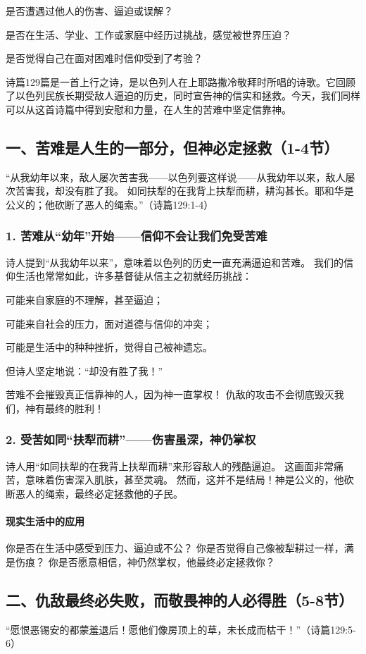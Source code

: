 \documentclass[a4paper, 12pt]{article}
\begin{document}
是否遭遇过他人的伤害、逼迫或误解？

是否在生活、学业、工作或家庭中经历过挑战，感觉被世界压迫？

是否觉得自己在面对困难时信仰受到了考验？

诗篇129篇是一首上行之诗，是以色列人在上耶路撒冷敬拜时所唱的诗歌。它回顾了以色列民族长期受敌人逼迫的历史，同时宣告神的信实和拯救。今天，我们同样可以从这首诗篇中得到安慰和力量，在人生的苦难中坚定信靠神。

\subsection*{一、苦难是人生的一部分，但神必定拯救（1-4节）}
“从我幼年以来，敌人屡次苦害我——以色列要这样说——从我幼年以来，敌人屡次苦害我，却没有胜了我。
如同扶犁的在我背上扶犁而耕，耕沟甚长。耶和华是公义的；他砍断了恶人的绳索。”（诗篇129:1-4）

\subsubsection*{1. 苦难从“幼年”开始——信仰不会让我们免受苦难}
诗人提到“从我幼年以来”，意味着以色列的历史一直充满逼迫和苦难。
我们的信仰生活也常常如此，许多基督徒从信主之初就经历挑战：

可能来自家庭的不理解，甚至逼迫；

可能来自社会的压力，面对道德与信仰的冲突；

可能是生活中的种种挫折，觉得自己被神遗忘。

但诗人坚定地说：“却没有胜了我！”

苦难不会摧毁真正信靠神的人，因为神一直掌权！
仇敌的攻击不会彻底毁灭我们，神有最终的胜利！
\subsubsection*{2. 受苦如同“扶犁而耕”——伤害虽深，神仍掌权}
诗人用“如同扶犁的在我背上扶犁而耕”来形容敌人的残酷逼迫。
这画面非常痛苦，意味着伤害深入肌肤，甚至灵魂。
然而，这并不是结局！神是公义的，他砍断恶人的绳索，最终必定拯救他的子民。
\paragraph*{现实生活中的应用}

你是否在生活中感受到压力、逼迫或不公？
你是否觉得自己像被犁耕过一样，满是伤痕？
你是否愿意相信，神仍然掌权，他最终必定拯救你？
\subsection*{二、仇敌最终必失败，而敬畏神的人必得胜（5-8节）}
“愿恨恶锡安的都蒙羞退后！愿他们像房顶上的草，未长成而枯干！”（诗篇129:5-6）
\end{document}
